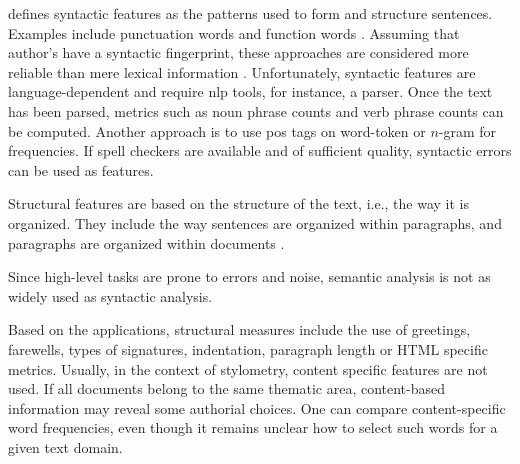 \citet{elmanarelbouanani_authorship_2014} defines syntactic features as the patterns used to form and structure sentences.
Examples include punctuation words and function words \citep{elmanarelbouanani_authorship_2014}.
Assuming that author's have a syntactic fingerprint, these approaches are considered more reliable than mere lexical information \citep{bevendorff_overview_2024}.
Unfortunately, syntactic features are language-dependent and require \ac{nlp} tools, for instance, a parser.
Once the text has been parsed, metrics such as noun phrase counts and verb phrase counts can be computed.
Another approach is to use \ac{pos} tags on word-token or $n$-gram for frequencies.
If spell checkers are available and of sufficient quality, syntactic errors can be used as features.

Structural features are based on the structure of the text, i.e., the way it is organized.
They include the way sentences are organized within paragraphs, and paragraphs are organized within documents \citep{elmanarelbouanani_authorship_2014}.


Since high-level tasks are prone to errors and noise, semantic analysis is not as widely used as syntactic analysis.


Based on the applications, structural measures include the use of greetings, farewells, types of signatures, indentation, paragraph length 
or HTML specific metrics.
Usually, in the context of stylometry, content specific features are not used.
If all documents belong to the same thematic area, content-based information may reveal some authorial choices. 
One can compare content-specific word frequencies, even though it remains unclear how to select such words for a given text domain.


